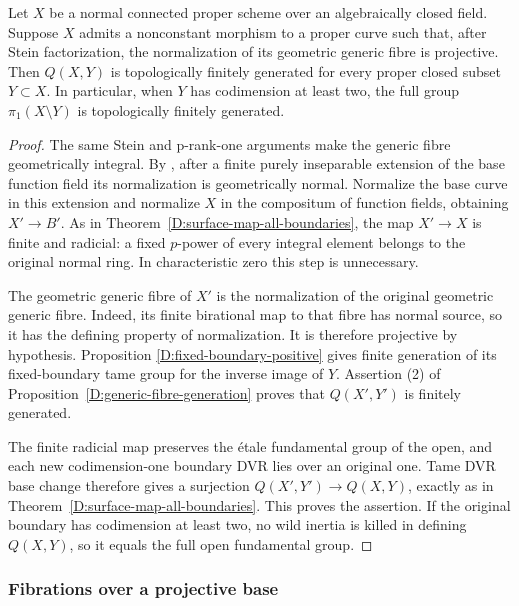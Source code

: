 \begin{corollary}
\label{D:projective-generic-normalization}
Let $X$ be a normal connected proper scheme over an
algebraically closed field.  Suppose $X$ admits a
nonconstant morphism to a proper curve such that, after
Stein factorization, the normalization of its geometric
generic fibre is projective.  Then $Q(X,Y)$ is
topologically finitely generated for every proper closed
subset $Y\subset X$.  In particular, when $Y$ has
codimension at least two, the full group
$\pi_1(X\setminus Y)$ is topologically finitely generated.
\end{corollary}
\begin{proof}
The same Stein and p-rank-one arguments make the generic
fibre geometrically integral.  By
\cite[Lemma 33.27.4, tag 0BXT]{C_StacksLogFibration}, after
a finite purely inseparable extension of the base function
field its normalization is geometrically normal.  Normalize
the base curve in this extension and normalize $X$ in the
compositum of function fields, obtaining $X'\to B'$.
As in Theorem~\ref{D:surface-map-all-boundaries}, the map
$X'\to X$ is finite and radicial: a fixed $p$-power of
every integral element belongs to the original normal
ring.  In characteristic zero this step is unnecessary.

The geometric generic fibre of $X'$ is the normalization
of the original geometric generic fibre.  Indeed, its
finite birational map to that fibre has normal source,
so it has the defining property of normalization.  It is
therefore projective by hypothesis.  Proposition
\ref{D:fixed-boundary-positive} gives finite generation
of its fixed-boundary tame group for the inverse image
of $Y$.  Assertion (2) of
Proposition~\ref{D:generic-fibre-generation} proves that
$Q(X',Y')$ is finitely generated.

The finite radicial map preserves the \'etale fundamental
group of the open, and each new codimension-one boundary
DVR lies over an original one.  Tame DVR base change
therefore gives a surjection $Q(X',Y')\to Q(X,Y)$,
exactly as in Theorem~\ref{D:surface-map-all-boundaries}.
This proves the assertion.  If the original boundary
has codimension at least two, no wild inertia is killed
in defining $Q(X,Y)$, so it equals the full open
fundamental group.
\end{proof}

\subsubsection{Fibrations over a projective base}

